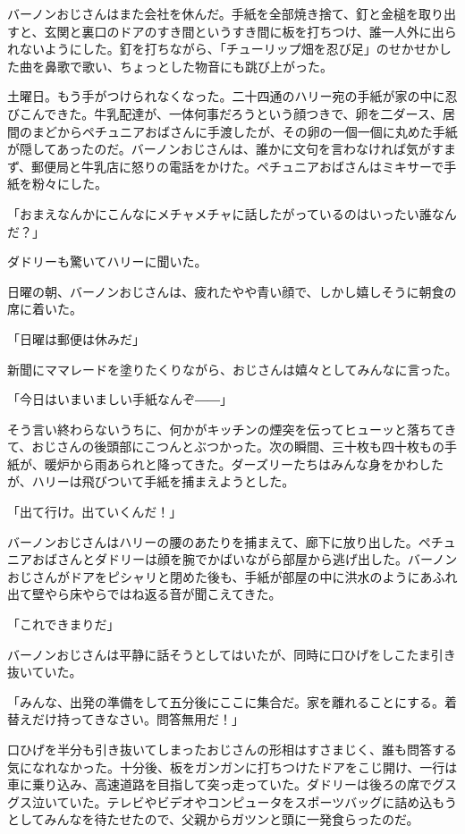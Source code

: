 \documentclass[10pt,a4paper]{article}
\begin{document}
\begin{CJK}{UTF8}{min}
バーノンおじさんはまた会社を休んだ。手紙を全部焼き捨て、釘と金槌を取り出すと、玄関と裏口のドアのすき間というすき間に板を打ちつけ、誰一人外に出られないようにした。釘を打ちながら、「チューリップ畑を忍び足」のせかせかした曲を鼻歌で歌い、ちょっとした物音にも跳び上がった。



土曜日。もう手がつけられなくなった。二十四通のハリー宛の手紙が家の中に忍びこんできた。牛乳配達が、一体何事だろうという顔つきで、卵を二ダース、居間のまどからペチュニアおばさんに手渡したが、その卵の一個一個に丸めた手紙が隠してあったのだ。バーノンおじさんは、誰かに文句を言わなければ気がすまず、郵便局と牛乳店に怒りの電話をかけた。ペチュニアおばさんはミキサーで手紙を粉々にした。

「おまえなんかにこんなにメチャメチャに話したがっているのはいったい誰なんだ？」

ダドリーも驚いてハリーに聞いた。



日曜の朝、バーノンおじさんは、疲れたやや青い顔で、しかし嬉しそうに朝食の席に着いた。

「日曜は郵便は休みだ」

新聞にママレードを塗りたくりながら、おじさんは嬉々としてみんなに言った。

「今日はいまいましい手紙なんぞ――」

そう言い終わらないうちに、何かがキッチンの煙突を伝ってヒューッと落ちてきて、おじさんの後頭部にこつんとぶつかった。次の瞬間、三十枚も四十枚もの手紙が、暖炉から雨あられと降ってきた。ダーズリーたちはみんな身をかわしたが、ハリーは飛びついて手紙を捕まえようとした。

「出て行け。出ていくんだ！」

バーノンおじさんはハリーの腰のあたりを捕まえて、廊下に放り出した。ペチュニアおばさんとダドリーは顔を腕でかばいながら部屋から逃げ出した。バーノンおじさんがドアをピシャリと閉めた後も、手紙が部屋の中に洪水のようにあふれ出て壁やら床やらではね返る音が聞こえてきた。

「これできまりだ」

バーノンおじさんは平静に話そうとしてはいたが、同時に口ひげをしこたま引き抜いていた。

「みんな、出発の準備をして五分後にここに集合だ。家を離れることにする。着替えだけ持ってきなさい。問答無用だ！」

口ひげを半分も引き抜いてしまったおじさんの形相はすさまじく、誰も問答する気になれなかった。十分後、板をガンガンに打ちつけたドアをこじ開け、一行は車に乗り込み、高速道路を目指して突っ走っていた。ダドリーは後ろの席でグスグス泣いていた。テレビやビデオやコンピュータをスポーツバッグに詰め込もうとしてみんなを待たせたので、父親からガツンと頭に一発食らったのだ。


\end{CJK}
\end{document}
